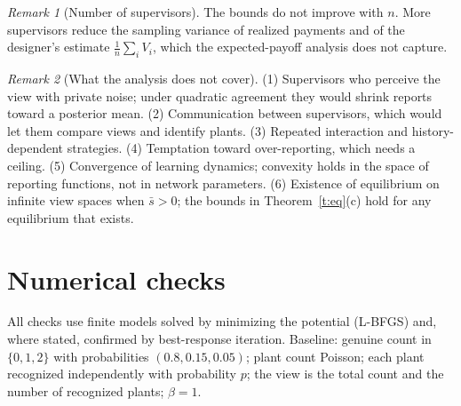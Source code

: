 \documentclass[11pt]{article}
\theoremstyle{definition}
\theoremstyle{remark}
\newtheorem{remark}{Remark}
\begin{document}
\begin{remark}[Number of supervisors]
The bounds do not improve with $n$. More supervisors reduce the sampling variance of realized payments and of the designer's estimate $\frac1n\sum_iV_i$, which the expected-payoff analysis does not capture.
\end{remark}

\begin{remark}[What the analysis does not cover]\label{r:open}
(1) Supervisors who perceive the view with private noise; under quadratic agreement they would shrink reports toward a posterior mean. (2) Communication between supervisors, which would let them compare views and identify plants. (3) Repeated interaction and history-dependent strategies. (4) Temptation toward over-reporting, which needs a ceiling. (5) Convergence of learning dynamics; convexity holds in the space of reporting functions, not in network parameters. (6) Existence of equilibrium on infinite view spaces when $\bar s>0$; the bounds in Theorem~\ref{t:eq}(c) hold for any equilibrium that exists.
\end{remark}

\section{Numerical checks}\label{sec:numerics}

All checks use finite models solved by minimizing the potential (L-BFGS) and, where stated, confirmed by best-response iteration. Baseline: genuine count in $\{0,1,2\}$ with probabilities $(0.8,0.15,0.05)$; plant count Poisson; each plant recognized independently with probability $p$; the view is the total count and the number of recognized plants; $\beta=1$.
\end{document}
